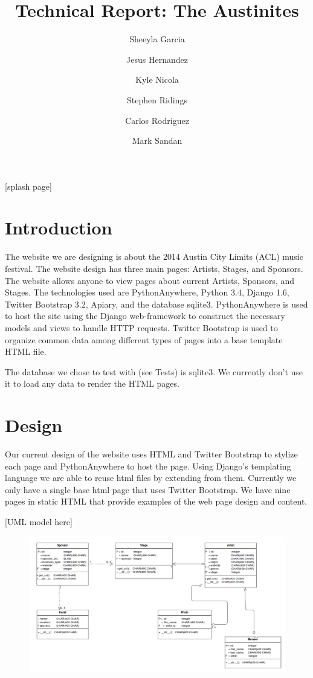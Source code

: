 \documentclass[12pt,english]{article}
\title{Technical Report: The Austinites}
\author{
  Sheeyla Garcia\\
  \and
  Jesus Hernandez\\
  \and
  Kyle Nicola\\
  \and
  Stephen Ridings\\
  \and
  Carlos Rodriguez\\
  \and
  Mark Sandan\\  
}
\date{ }
\begin{document}
\thispagestyle{plain}
\maketitle
 
 [splash page]
 
\tableofcontents

\section{Introduction} 
The website we are designing is about the 2014 Austin City Limits (ACL) music festival. The website design has three main pages: Artists, Stages, and Sponsors.
The website allows anyone to view pages about current Artists, Sponsors, and Stages. The technologies used are PythonAnywhere, Python 3.4, Django 1.6,
Twitter Bootstrap 3.2, Apiary, and the database sqlite3. PythonAnywhere is used to host the site using the Django web-framework to 
construct the necessary models and views to handle HTTP requests. Twitter Bootstrap is used to organize common data among different
types of pages into a base template HTML file. 

The database we chose to test with (see Tests) is sqlite3. We currently don't use it to load any data to render the HTML pages.

\section{Design}
Our current design of the website uses HTML and Twitter Bootstrap to stylize each page and PythonAnywhere to host the page. 
Using Django's templating language we are able to reuse html files by extending from them. Currently we only have a single base html page that
uses Twitter Bootstrap. We have nine pages in static HTML that provide examples of the web page design and content.

[UML model here]
\begin{figure}[h]
\includegraphics[width=\textwidth]{UML}
\end{figure}
\end{document}
